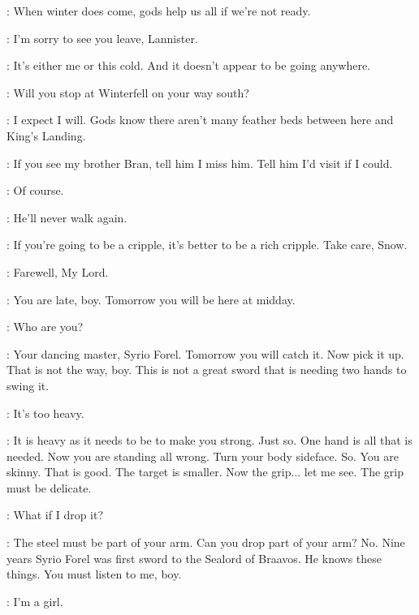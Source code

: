 \AEMON: When winter does come, gods help us all if we're not ready. 


\JON: I'm sorry to see you leave, Lannister. 

\TYRION: It's either me or this cold. And it doesn't appear to be going anywhere. 

\JON: Will you stop at Winterfell on your way south? 

\TYRION: I expect I will. Gods know there aren't many feather beds between here and King's Landing. 

\JON: If you see my brother Bran, tell him I miss him. Tell him I'd visit if I could. 

\TYRION: Of course. 

\JON: He'll never walk again. 

\TYRION: If you're going to be a cripple, it's better to be a rich cripple. Take care, Snow. 

\JON: Farewell, My Lord. 


\scene



\SYRIO: You are late, boy. Tomorrow you will be here at midday. 

\ARYA: Who are you? 

\SYRIO: Your dancing master, Syrio Forel.  Tomorrow you will catch it. Now pick it up.  That is not the way, boy. This is not a great sword that is needing two hands to swing it. 

\ARYA: It's too heavy. 

\SYRIO: It is heavy as it needs to be to make you strong. Just so. One hand is all that is needed. Now you are standing all wrong. Turn your body sideface. So. You are skinny. That is good. The target is smaller. Now the grip$\ldots$ let me see. The grip must be delicate. 

\ARYA: What if I drop it? 

\SYRIO: The steel must be part of your arm. Can you drop part of your arm? No. Nine years Syrio Forel was first sword to the Sealord of Braavos. He knows these things. You must listen to me, boy. 

\ARYA: I'm a girl. 


